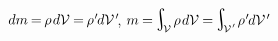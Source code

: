 \vspace{-0.5em} \noindent {}
${dm \hspace{-0.15ex} = \hspace{-0.2ex} \rho \hspace{.2ex} d\mathcal{V} \hspace{-0.1ex} = \hspace{-0.2ex} \rho\hspace{.1ex}' \hspace{-0.2ex} d\mathcal{V}\hspace{.2ex}'\hspace{-0.5ex}}$,
${m \hspace{-0.1ex} = \hspace{-0.2ex} \scalebox{1.4}{$\integral$}_{\hspace{-0.5ex}\raisemath{-0.05em}{\mathcal{V}}} \hspace{.3ex} \rho \hspace{.2ex} d\mathcal{V} \hspace{-0.1ex}
= \hspace{-0.2ex} \scalebox{1.4}{$\integral$}_{\hspace{-0.5ex}\raisemath{-0.05em}{\mathcal{V}\hspace{.12ex}'}} \hspace{.2ex} \rho\hspace{.1ex}' \hspace{-0.2ex} d\mathcal{V}\hspace{.2ex}'\hspace{-0.25ex}}$
%

